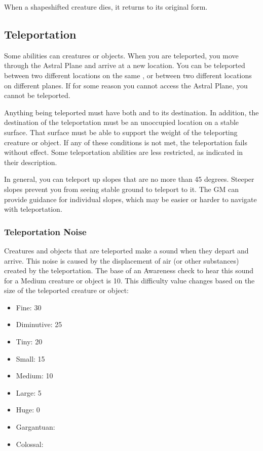     When a shapeshifted creature dies, it returns to its original form.

  \subsection{Teleportation}\label{Teleportation}
    Some abilities can  creatures or objects.
    When you are teleported, you move through the Astral Plane and arrive at a new location.
    You can be teleported between two different locations on the same , or between two different locations on different planes.
    If for some reason you cannot access the Astral Plane, you cannot be teleported.

    Anything being teleported must have both  and  to its destination.
    In addition, the destination of the teleportation must be an unoccupied location on a stable surface.
    That surface must be able to support the weight of the teleporting creature or object.
    If any of these conditions is not met, the teleportation fails without effect.
    Some teleportation abilities are less restricted, as indicated in their description.

    In general, you can teleport up slopes that are no more than 45 degrees.
    Steeper slopes prevent you from seeing stable ground to teleport to it.
    The GM can provide guidance for individual slopes, which may be easier or harder to navigate with teleportation.

    \subsubsection{Teleportation Noise}\label{Teleportation Noise}
      Creatures and objects that are teleported make a sound when they depart and arrive.
      This noise is caused by the displacement of air (or other substances) created by the teleportation.
      The base  of an Awareness check to hear this sound for a Medium creature or object is 10.
      This difficulty value changes based on the size of the teleported creature or object:

      \begin{itemize}
        \item Fine: 30
        \item Diminutive: 25
        \item Tiny: 20
        \item Small: 15
        \item Medium: 10
        \item Large: 5
        \item Huge: 0
        \item Gargantuan: 
        \item Colossal: 
      \end{itemize}

